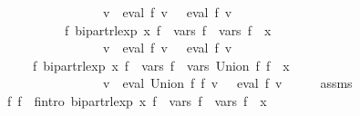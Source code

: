 \begin{isabellebody}
\ \ \ \ \ \ \ \ \ \ \ \ \ \ \ \ {\isacharparenleft}{\kern0pt}{\isasymforall}v{\isachardot}{\kern0pt}\ {\isasymPsi}\ {\isacharparenleft}{\kern0pt}eval\ f{}\ v{\isacharparenright}{\kern0pt}\ {\isacharequal}{\kern0pt}\ {\isasymPsi}\ {\isacharparenleft}{\kern0pt}eval\ f{\isacharprime}{\kern0pt}\ v{\isacharparenright}{\kern0pt}{\isacharparenright}{\kern0pt}{\isachardoublequoteclose}\isanewline
\ \ \ \ \ \ \ \ \ \ {\isachardoublequoteopen}{\isasymexists}f{\isacharprime}{\kern0pt}{\isachardot}{\kern0pt}\ bipart{\isacharunderscore}{\kern0pt}rlexp\ x\ f{\isacharprime}{\kern0pt}\ {\isasymand}\ vars\ f{\isacharprime}{\kern0pt}\ {\isacharequal}{\kern0pt}\ vars\ f{}\ {\isasymunion}\ {\isacharbraceleft}{\kern0pt}x{\isacharbraceright}{\kern0pt}\ {\isasymand}\isanewline
\ \ \ \ \ \ \ \ \ \ \ \ \ \ \ \ {\isacharparenleft}{\kern0pt}{\isasymforall}v{\isachardot}{\kern0pt}\ {\isasymPsi}\ {\isacharparenleft}{\kern0pt}eval\ f{}\ v{\isacharparenright}{\kern0pt}\ {\isacharequal}{\kern0pt}\ {\isasymPsi}\ {\isacharparenleft}{\kern0pt}eval\ f{\isacharprime}{\kern0pt}\ v{\isacharparenright}{\kern0pt}{\isacharparenright}{\kern0pt}{\isachardoublequoteclose}\isanewline
\ \ \ \ \ {\isachardoublequoteopen}{\isasymexists}f{\isacharprime}{\kern0pt}{\isachardot}{\kern0pt}\ bipart{\isacharunderscore}{\kern0pt}rlexp\ x\ f{\isacharprime}{\kern0pt}\ {\isasymand}\ vars\ f{\isacharprime}{\kern0pt}\ {\isacharequal}{\kern0pt}\ vars\ {\isacharparenleft}{\kern0pt}Union\ f{}\ f{}{\isacharparenright}{\kern0pt}\ {\isasymunion}\ {\isacharbraceleft}{\kern0pt}x{\isacharbraceright}{\kern0pt}\ {\isasymand}\isanewline
\ \ \ \ \ \ \ \ \ \ \ \ \ \ \ \ {\isacharparenleft}{\kern0pt}{\isasymforall}v{\isachardot}{\kern0pt}\ {\isasymPsi}\ {\isacharparenleft}{\kern0pt}eval\ {\isacharparenleft}{\kern0pt}Union\ f{}\ f{}{\isacharparenright}{\kern0pt}\ v{\isacharparenright}{\kern0pt}\ {\isacharequal}{\kern0pt}\ {\isasymPsi}\ {\isacharparenleft}{\kern0pt}eval\ f{\isacharprime}{\kern0pt}\ v{\isacharparenright}{\kern0pt}{\isacharparenright}{\kern0pt}{\isachardoublequoteclose}\isanewline
%
\isadelimproof
%
\endisadelimproof
%
\isatagproof
{}\isamarkupfalse%
\ {\isacharminus}{\kern0pt}\isanewline
\ \ \isamarkupfalse%
\ assms\ \isamarkupfalse%
\ f{}{\isacharprime}{\kern0pt}\ f{}{\isacharprime}{\kern0pt}\ \ f{}{\isacharprime}{\kern0pt}{\isacharunderscore}{\kern0pt}intro{\isacharcolon}{\kern0pt}\ {\isachardoublequoteopen}bipart{\isacharunderscore}{\kern0pt}rlexp\ x\ f{}{\isacharprime}{\kern0pt}\ {\isasymand}\ vars\ f{}{\isacharprime}{\kern0pt}\ {\isacharequal}{\kern0pt}\ vars\ f{}\ {\isasymunion}\ {\isacharbraceleft}{\kern0pt}x{\isacharbraceright}{\kern0pt}\ {\isasymand}\isanewline

\end{isabellebody}
